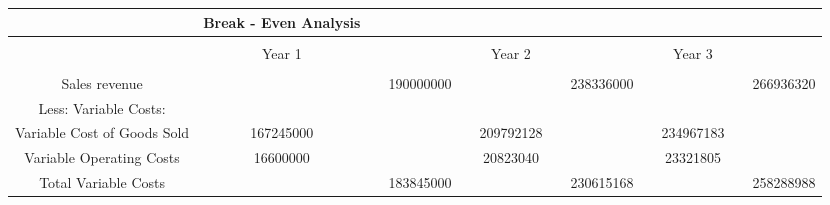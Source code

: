 {\begin{longtable}[c]{|c|c|c|c|c|c|c|c|c|c|c|c|}
\hline
                                                                                                                                & Break - Even Analysis             &  &              &  &           &  &           &  &           &  &           \\
\hline
                                                                                                                                &                                   &  &              &  &           &  &           &  &           &  &           \\
\hline
                                                                                                                                & Year 1                            &  &              &  & Year 2    &  &           &  & Year 3    &  &           \\
\hline
                                                                                                                                &                                   &  &              &  &           &  &           &  &           &  &           \\
\hline
Sales revenue                                                                                                                   &                                   &  & 190000000    &  &           &  & 238336000 &  &           &  & 266936320 \\
\hline
Less: Variable Costs:                                                                                                           &                                   &  &              &  &           &  &           &  &           &  &           \\
\hline
Variable Cost of Goods Sold                                                                                                     & 167245000                         &  &              &  & 209792128 &  &           &  & 234967183 &  &           \\
\hline
Variable Operating Costs                                                                                                        & 16600000                          &  &              &  & 20823040  &  &           &  & 23321805  &  &           \\
\hline
Total Variable Costs                                                                                                            &                                   &  & 183845000    &  &           &  & 230615168 &  &           &  & 258288988 \\

\end{longtable}}
